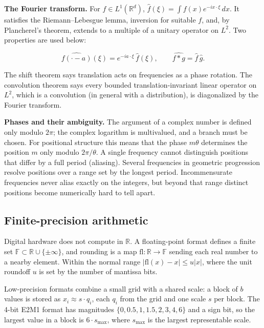 \textbf{The Fourier transform.} For \(f \in L^{1}(\mathbb{R}^{d})\),
\(\hat{f}(\xi) = \int f(x)e^{-ix\cdot\xi}\, dx\). It satisfies the Riemann--Lebesgue lemma,
inversion for suitable \(f\), and, by Plancherel's theorem, extends to a
multiple of a unitary operator on \(L^{2}\). Two properties are used
below:

\[
\widehat{f(\cdot - a)}(\xi) = e^{-i a \cdot \xi}\, \hat f(\xi), \qquad \widehat{f * g} = \hat f\, \hat g.
\]

The shift theorem says translation acts on frequencies as a phase
rotation. The convolution theorem says every bounded translation-invariant
linear operator on \(L^2\), which is a convolution (in general with a
distribution), is diagonalized by the Fourier transform.

\textbf{Phases and their ambiguity.} The argument of a complex number is
defined only modulo \(2\pi\); the complex logarithm is multivalued, and a
branch must be chosen. For positional structure this means that the
phase \(m\theta\) determines the position \(m\) only modulo \(2\pi/\theta\). A single frequency
cannot distinguish positions that differ by a full period (aliasing).
Several frequencies in geometric progression resolve positions over a
range set by the longest period. Incommensurate frequencies never alias
exactly on the integers, but beyond that range distinct positions become
numerically hard to tell apart.

\subsection{Finite-precision
arithmetic}\label{sec:math:I9}

Digital hardware does not compute in \(\mathbb{R}\). A floating-point
format defines a finite set \(\mathbb{F} \subset \mathbb{R} \cup \{\pm\infty\}\),
and rounding is a map \(\mathrm{fl}\colon \mathbb{R} \to \mathbb{F}\) sending each
real number to a nearby element. Within the normal range \(|\mathrm{fl}(x)
- x| \le u|x|\), where the unit roundoff \(u\) is set by
the number of mantissa bits.

Low-precision formats combine a small grid with a shared scale: a block
of \(b\) values is stored as \(x_{i} \approx s \cdot q_{i}\), each \(q_{i}\) from
the grid and one scale \(s\) per block. The 4-bit E2M1 format has magnitudes
\(\{0, 0.5, 1, 1.5, 2, 3, 4, 6\}\) and a sign bit, so the largest value in a
block is \(6 \cdot s_{\max}\), where \(s_{\max}\) is the largest representable scale.

